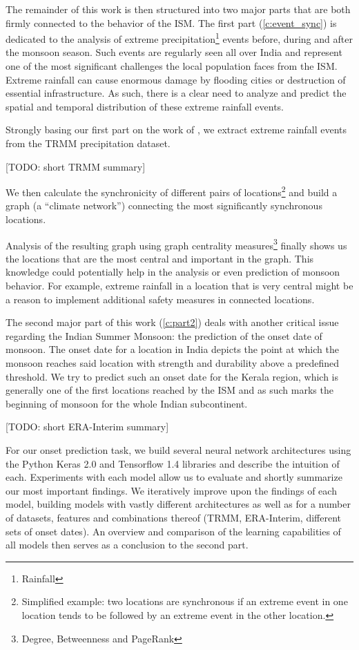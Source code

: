 The remainder of this work is then structured into two major parts that are both firmly connected to the behavior of the ISM. The first part (\cref{c:event_sync}) is dedicated to the analysis of extreme precipitation\footnote{Rainfall} events before, during and after the monsoon season. Such events are regularly seen all over India and represent one of the most significant challenges the local population faces from the ISM. Extreme rainfall can cause enormous damage by flooding cities or destruction of essential infrastructure. As such, there is a clear need to analyze and predict the spatial and temporal distribution of these extreme rainfall events.

Strongly basing our first part on the work of \citet{Stolbova.2015}, we extract extreme rainfall events from the TRMM precipitation dataset.

[TODO: short TRMM summary]

We then calculate the synchronicity of different pairs of locations\footnote{Simplified example: two locations are synchronous if an extreme event in one location tends to be followed by an extreme event in the other location.} and build a graph (a ``climate network'') connecting the most significantly synchronous locations.

Analysis of the resulting graph using graph centrality measures\footnote{Degree, Betweenness and PageRank} finally shows us the locations that are the most central and important in the graph. This knowledge could potentially help in the analysis or even prediction of monsoon behavior. For example, extreme rainfall in a location that is very central might be a reason to implement additional safety measures in connected locations.

The second major part of this work (\cref{c:part2}) deals with another critical issue regarding the Indian Summer Monsoon: the prediction of the onset date of monsoon. The onset date for a location in India depicts the point at which the monsoon reaches said location with strength and durability above a predefined threshold. We try to predict such an onset date for the Kerala region, which is generally one of the first locations reached by the ISM and as such marks the beginning of monsoon for the whole Indian subcontinent.

[TODO: short ERA-Interim summary]

For our onset prediction task, we build several neural network architectures using the Python Keras 2.0 and Tensorflow 1.4 libraries and describe the intuition of each. Experiments with each model allow us to evaluate and shortly summarize our most important findings. We iteratively improve upon the findings of each model, building models with vastly different architectures as well as for a number of datasets, features and combinations thereof (TRMM, ERA-Interim, different sets of onset dates). An overview and comparison of the learning capabilities of all models then serves as a conclusion to the second part.

